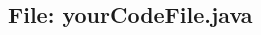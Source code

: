 \documentclass[12pt,a4paper]{report}
\theoremstyle{definition}
\begin{document}

\begin{landscape}
\begin{multicols}{2}
\section{File: yourCodeFile.java}

\end{multicols}
\end{landscape}
\end{document}
